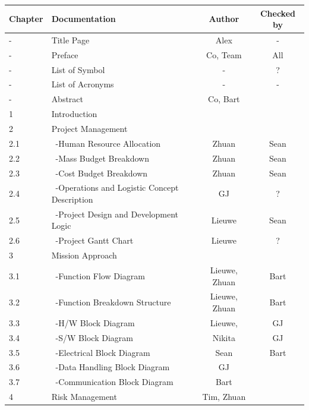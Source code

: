 \newpage
\begin{center}
\begin{longtable}{|l|l|c|c|}\hline
 Chapter & Documentation                      & Author & Checked by \\\hline 
 -       & Title Page                           & Alex & - \\\hline                  
 -       & Preface                              & Co, Team& All \\\hline
 -       & List of Symbol                       & - & ? \\\hline
 -       & List of Acronyms                     & - & - \\\hline
 -       & Abstract                             & Co, Bart &\\\hline
 1       & Introduction                         &&\\\hline\hline
 2       & Project Management                   &&\\\hline
 2.1     & \ -Human Resource Allocation         & Zhuan & Sean \\\hline
 2.2     & \ -Mass Budget Breakdown             & Zhuan & Sean \\\hline
 2.3     & \ -Cost Budget Breakdown             & Zhuan & Sean \\\hline
 2.4     & \ -Operations and Logistic Concept Description & GJ & ? \\\hline
 2.5     & \ -Project Design and Development Logic & Lieuwe & Sean \\\hline
 2.6     & \ -Project Gantt Chart               & Lieuwe & ? \\\hline\hline
 3       & Mission Approach                     &&\\\hline
 3.1     & \ -Function Flow Diagram             & Lieuwe, Zhuan & Bart\\\hline
 3.2     & \ -Function Breakdown Structure      & Lieuwe, Zhuan & Bart \\\hline
 3.3     & \ -H/W Block Diagram                 & Lieuwe, & GJ \\\hline
 3.4     & \ -S/W Block Diagram                 & Nikita & GJ \\\hline
 3.5     & \ -Electrical Block Diagram          & Sean & Bart \\\hline
 3.6     & \ -Data Handling Block Diagram       & GJ & \\\hline
 3.7     & \ -Communication Block Diagram       & Bart &\\\hline
 4       & Risk Management                      & Tim, Zhuan & \\\hline\hline

\end{longtable}
\end{center}
